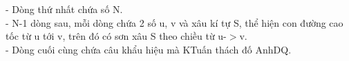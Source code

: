 - Dòng thứ nhất chứa số N.   
\\   - N-1 dòng sau, mỗi dòng chứa 2 số u, v và xâu kí tự S, thể hiện con đường cao tốc từ u tới v, trên đó có sơn xâu S theo chiều từ u-$>$v.   
\\   - Dòng cuối cùng chứa câu khẩu hiệu mà KTuấn thách đố AnhDQ.